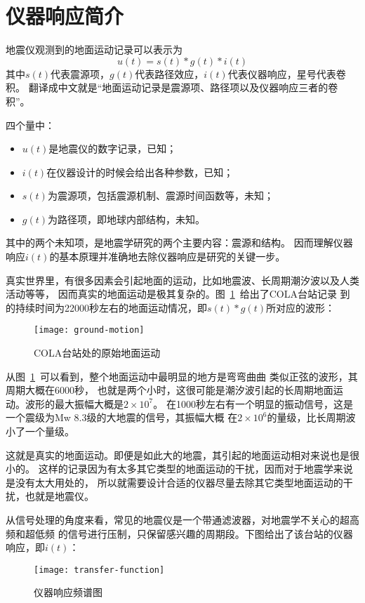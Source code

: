 \section{仪器响应简介}
地震仪观测到的地面运动记录可以表示为
\[  u(t) = s(t) * g(t) * i(t) \]
其中$s(t)$代表震源项，$g(t)$代表路径效应，$i(t)$代表仪器响应，星号代表卷积。
翻译成中文就是``地面运动记录是震源项、路径项以及仪器响应三者的卷积''。

四个量中：
\begin{itemize}
\item $u(t)$是地震仪的数字记录，已知；
\item $i(t)$在仪器设计的时候会给出各种参数，已知；
\item $s(t)$为震源项，包括震源机制、震源时间函数等，未知；
\item $g(t)$为路径项，即地球内部结构，未知。
\end{itemize}
其中的两个未知项，是地震学研究的两个主要内容：震源和结构。
因而理解仪器响应$i(t)$的基本原理并准确地去除仪器响应是研究的关键一步。

真实世界里，有很多因素会引起地面的运动，比如地震波、长周期潮汐波以及人类活动等等，
因而真实的地面运动是极其复杂的。图~\ref{fig:ground-motion}~给出了COLA台站记录
到的持续时间为22000秒左右的地面运动情况，即$s(t)*g(t)$所对应的波形：

\begin{figure}[H]
\centering
\texttt{[image: ground-motion]}
\caption{COLA台站处的原始地面运动}
\label{fig:ground-motion}
\end{figure}

从图~\ref{fig:ground-motion}~可以看到，整个地面运动中最明显的地方是弯弯曲曲
类似正弦的波形，其周期大概在6000秒，
也就是两个小时，这很可能是潮汐波引起的长周期地面运动。波形的最大振幅大概是$2\times10^7$。
在1000秒左右有一个明显的振动信号，这是一个震级为Mw 8.3级的大地震的信号，其振幅大概
在$2\times10^6$的量级，比长周期波小了一个量级。

这就是真实的地面运动。即便是如此大的地震，其引起的地面运动相对来说也是很小的。
这样的记录因为有太多其它类型的地面运动的干扰，因而对于地震学来说是没有太大用处的，
所以就需要设计合适的仪器尽量去除其它类型地面运动的干扰，也就是地震仪。

从信号处理的角度来看，常见的地震仪是一个带通滤波器，对地震学不关心的超高频和超低频
的信号进行压制，只保留感兴趣的周期段。下图给出了该台站的仪器响应，即$i(t)$：

\begin{figure}[H]
\centering
\texttt{[image: transfer-function]}
\caption{仪器响应频谱图}
\label{fig:transfer-function}
\end{figure}

